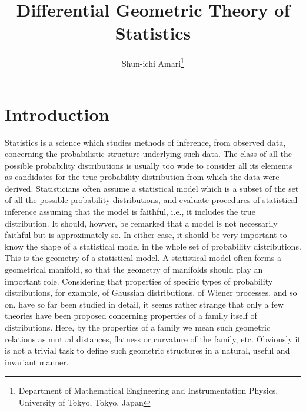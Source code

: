 \documentclass[11pt]{article}
\begin{document}
\newcommand{\tr}{\text{tr}}
\newcommand{\E}{\textbf{E}}
\newcommand{\diag}{\text{diag}}
\newcommand{\argmax}{\text{argmax}}
\newcommand{\argmin}{\text{argmin}}
\newcommand{\Cov}{\text{Cov}}
\newcommand{\Vol}{\text{Vol}}
\pagestyle{fancy}

\title{Differential Geometric Theory of Statistics}

\author{Shun-ichi Amari\thanks{
Department of Mathematical Engineering and Instrumentation Physics, University of Tokyo, Tokyo, Japan}}

\maketitle

\tableofcontents

\section{Introduction}

       
            Statistics is a science which studies methods of inference, from
observed data, concerning the probabilistic structure underlying such data.
The class of all the possible probability distributions is usually too wide to
consider all its elements as candidates for the true probability distribution
from which the data were derived.  Statisticians often assume a statistical
model which is a subset of the set of all the possible probability distribut{ions,}
      and evaluate procedures of statistical inference assuming that the model
is faithful, i.e., it includes the true distribution.  It should, howver, be
remarked that a model is not necessarily faithful but is approximately so.  In
either case, it should be very important to know the shape of a statistical
model in the whole set of probability distributions.  This is the geometry of a
statistical model.  A statistical model often forms a geometrical manifold, so
that the geometry of manifolds should play an important role.  Considering that
properties of specific types of probability distributions, for example, of
Gaussian distributions, of Wiener processes, and so on, have so far been studied
in detail, it seems rather strange that only a few theories have been proposed
concerning properties of a family itself of distributions.  Here, by the proper{ties}
     of a family we mean such geometric relations as mutual distances, flatness
or curvature of the family, etc.  Obviously it is not a trivial task to define 
such geometric structures in a natural, useful and invariant manner.
\end{document}
